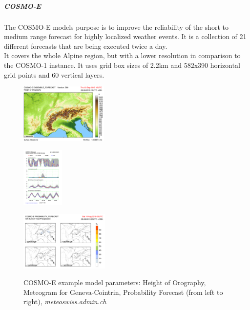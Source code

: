 \subparagraph{COSMO-E}
The COSMO-E models purpose is to improve the reliability of the short to medium range forecast for highly localized weather events. It is a collection of 21 different forecasts that are being executed twice a day. \\
It covers the whole Alpine region, but with a lower resolution in comparison to the COSMO-1 instance. It uses grid box sizes of 2.2km and 582x390 horizontal grid points and 60 vertical layers.
\begin{figure}[h]
	\begin{minipage}{.32\columnwidth}
		\centering
		\includegraphics[height=8em]{images/cosmo-m-general.png}
		\label{fig:cosmo-m-general}
		\vspace{-1em}
	\end{minipage}
	\begin{minipage}{.32\columnwidth}
		\centering
		\includegraphics[height=8em]{images/cosmo-m-meteograph-geneve.png}
		\label{fig:cosmo-m-meteograph-geneve}
	\end{minipage}
	\begin{minipage}{.32\columnwidth}
		\centering
		\includegraphics[height=8em]{images/cosmo-m-probability-forecast.png}
		\label{fig:cosmo-m-probability-forecast}
		\vspace{-1em}
	\end{minipage}
	\caption{COSMO-E example model parameters: Height of Orography, Meteogram for Geneva-Cointrin, Probability Forecast (from left to right), \textit{meteoswiss.admin.ch}}
\end{figure}


